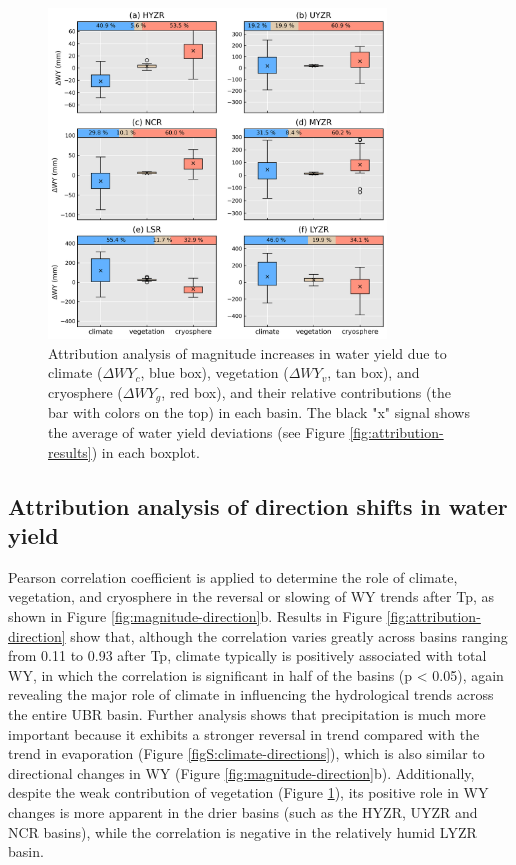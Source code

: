 \documentclass[hess, manuscript]{copernicus}
\begin{document}
\begin{figure}[ht]
    \includegraphics[width=0.8\textwidth]{02-figures/attribution-in-magnitude.png}
    \caption{Attribution analysis of magnitude increases in water yield due to climate ($\Delta WY_c$, blue box), vegetation ($\Delta WY_v$, tan box), and cryosphere ($\Delta WY_g$, red box), and their relative contributions (the bar with colors on the top) in each basin.  The black "x" signal shows the average of water yield deviations (see Figure \ref{fig:attribution-results}) in each boxplot.}
    \label{fig:attribution-magnitude}
\end{figure}

\subsection{Attribution analysis of direction shifts in water yield}
Pearson correlation coefficient is applied to determine the role of climate, vegetation, and cryosphere in the reversal or slowing of WY trends after Tp, as shown in Figure \ref{fig:magnitude-direction}b. Results in Figure \ref{fig:attribution-direction} show that, although the correlation varies greatly across basins ranging from 0.11 to 0.93 after Tp, climate typically is positively associated with total WY, in which the correlation is significant in half of the basins (p < 0.05), again revealing the major role of climate in influencing the hydrological trends across the entire UBR basin. Further analysis shows that precipitation is much more important because it exhibits a stronger reversal in trend compared with the trend in evaporation (Figure \ref{figS:climate-directions}), which is also similar to directional changes in WY (Figure \ref{fig:magnitude-direction}b). Additionally, despite the weak contribution of vegetation (Figure \ref{fig:attribution-magnitude}), its positive role in WY changes is more apparent in the drier basins (such as the HYZR, UYZR and NCR basins), while the correlation is negative in the relatively humid LYZR basin.
\end{document}
